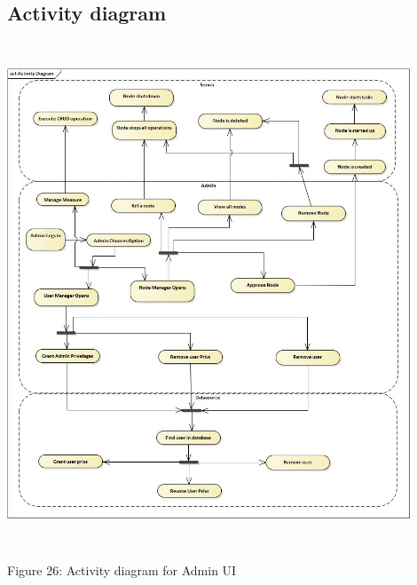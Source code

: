 \subsection{Activity diagram}
    \includegraphics[width=12cm,height=15cm,keepaspectratio]{admin_ui/images/Activity_Diagram.jpg}
	\begin{center}
	    \small{Figure 26: Activity diagram for Admin UI}
    \end{center}


